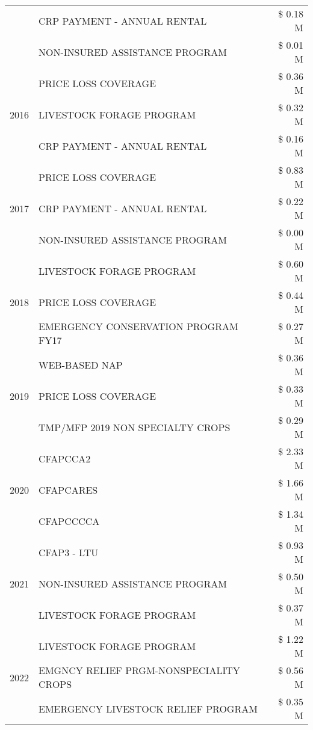 \begin{tabular}{llr}
 & CRP PAYMENT - ANNUAL RENTAL & \$ 0.18 M \\
 & NON-INSURED ASSISTANCE PROGRAM & \$ 0.01 M \\
\cline{1-3}
\multirow[t]{3}{*}{2016} & PRICE LOSS COVERAGE & \$ 0.36 M \\
 & LIVESTOCK FORAGE PROGRAM & \$ 0.32 M \\
 & CRP PAYMENT - ANNUAL RENTAL & \$ 0.16 M \\
\cline{1-3}
\multirow[t]{3}{*}{2017} & PRICE LOSS COVERAGE & \$ 0.83 M \\
 & CRP PAYMENT - ANNUAL RENTAL & \$ 0.22 M \\
 & NON-INSURED ASSISTANCE PROGRAM & \$ 0.00 M \\
\cline{1-3}
\multirow[t]{3}{*}{2018} & LIVESTOCK FORAGE PROGRAM & \$ 0.60 M \\
 & PRICE LOSS COVERAGE & \$ 0.44 M \\
 & EMERGENCY CONSERVATION PROGRAM FY17 & \$ 0.27 M \\
\cline{1-3}
\multirow[t]{3}{*}{2019} & WEB-BASED NAP & \$ 0.36 M \\
 & PRICE LOSS COVERAGE & \$ 0.33 M \\
 & TMP/MFP 2019 NON SPECIALTY CROPS & \$ 0.29 M \\
\cline{1-3}
\multirow[t]{3}{*}{2020} & CFAPCCA2 & \$ 2.33 M \\
 & CFAPCARES & \$ 1.66 M \\
 & CFAPCCCCA & \$ 1.34 M \\
\cline{1-3}
\multirow[t]{3}{*}{2021} & CFAP3 - LTU & \$ 0.93 M \\
 & NON-INSURED ASSISTANCE PROGRAM & \$ 0.50 M \\
 & LIVESTOCK FORAGE PROGRAM & \$ 0.37 M \\
\cline{1-3}
\multirow[t]{3}{*}{2022} & LIVESTOCK FORAGE PROGRAM & \$ 1.22 M \\
 & EMGNCY RELIEF PRGM-NONSPECIALITY CROPS & \$ 0.56 M \\
 & EMERGENCY LIVESTOCK RELIEF PROGRAM & \$ 0.35 M \\
\cline{1-3}
\bottomrule
\end{tabular}
